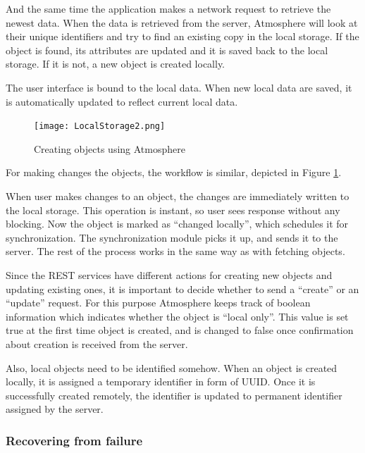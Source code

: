 And the same time the application makes a network request to retrieve the newest data.  When the data is retrieved from the server,  Atmosphere will look at their unique identifiers and try to find an existing copy in the local storage. If the object is found, its attributes are updated and it is saved back to the local storage. If it is not, a new object is created locally. 

The user interface is bound to the local data. When new local data are saved, it is automatically updated to reflect current local data. 

\begin{figure}[ht!]
\centering
\texttt{[image: LocalStorage2.png]}
\caption{Creating objects using Atmosphere \label{fig:2}}
\end{figure}

For making changes the objects, the workflow is similar, depicted in Figure \ref{fig:2}.

When user makes changes to an object,  the changes are immediately written to the local storage.  This operation is instant, so user sees response without any blocking. Now the object is marked as ``changed locally'', which schedules it for synchronization. The synchronization module picks it up, and sends it to the server.  The rest of the process works in the same way as with fetching objects.

Since the REST services have different actions for creating new objects and updating existing ones, it is important to decide whether to send a ``create'' or an ``update'' request. For this purpose Atmosphere keeps track of boolean information which indicates whether the object is ``local only''. This value is set true at the first time object is created, and is changed to false once confirmation about creation is received from the server.

Also, local objects need to be identified somehow. When an object is created locally, it is assigned a temporary identifier in form of UUID. Once it is successfully created remotely, the identifier is updated to permanent identifier assigned by the server.

\subsubsection{Recovering from failure}
\label{sec:failure_recovery}

